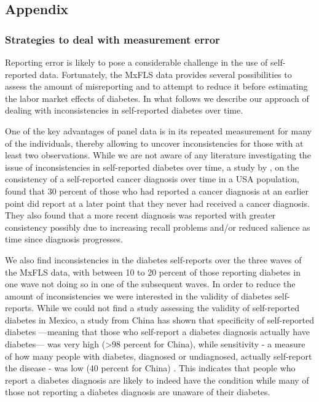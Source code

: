 \documentclass[12pt,english,british]{article}
\begin{document}
\begin{appendix}
\clearpage


\part*{\label{part:Appendix}Appendix}

\section{\label{sec:Appendix}Strategies to deal with measurement error}

Reporting error is likely to pose a considerable
challenge in the use of self-reported data. Fortunately, the \ac{MxFLS}
data provides several possibilities to assess the amount of misreporting and to attempt to reduce it before estimating the labor market effects of diabetes. In what
follows we describe our approach of dealing with inconsistencies in
self-reported diabetes over time.

One of the key advantages of panel data is in its repeated measurement
for many of the individuals, thereby allowing to uncover inconsistencies
for those with at least two observations. While we are
not aware of any literature investigating the issue of inconsistencies
in self-reported diabetes over time, a study by \citet{Zajacova2010},
on the consistency of a self-reported cancer diagnosis over time in
a USA population, found that 30 percent of those who had reported a
cancer diagnosis at an earlier point did report at a later point
that they never had received a cancer diagnosis. They also found that
a more recent diagnosis was reported with greater consistency possibly
due to increasing recall problems and/or reduced salience as time
since diagnosis progresses.

We also find inconsistencies in the diabetes self-reports over
the three waves of the \ac{MxFLS} data, with between 10 to 20 percent
of those reporting diabetes in one wave not doing so in
one of the subsequent waves. In order to reduce the amount of inconsistencies we were interested in the validity of diabetes self-reports. While we could not find a study assessing
the validity of self-reported diabetes in Mexico, a study from China
has shown that specificity of self-reported diabetes ---meaning that
those who self-report a diabetes diagnosis actually have diabetes--- was very high (>98 percent for China), while sensitivity - a measure
of how many people with diabetes, diagnosed or undiagnosed, actually
self-report the disease - was low (40 percent for China) \citep{Yuan2015}.
This indicates that people who report a diabetes diagnosis are likely
to indeed have the condition while many of those not reporting
a diabetes diagnosis are unaware of their diabetes.


\end{appendix}
\end{document}

